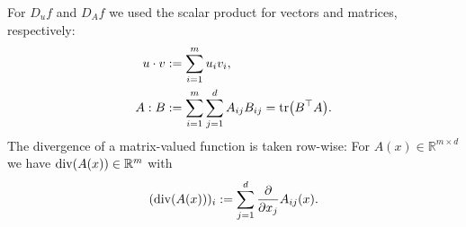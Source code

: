 For $D_uf$ and $D_Af$ we used the scalar product for vectors and matrices, respectively:
\begin{align*}
	u\cdot v&:=\sum_{i=1}^m{u_iv_i},\\
	A:B&:=\sum_{i=1}^m{\sum_{j=1}^d{A_{ij}B_{ij}}}=\operatorname{tr}\mathopen{}\left(B^\top A\right)\mathclose{}.
\end{align*}
The divergence of a matrix-valued function is taken row-wise: For $A(x)\in\mathbb{R}^{m\times d}$ we have $\operatorname{div}\mathopen{}\left(A(x)\right)\mathclose{}\in\mathbb{R}^m$ with
\[(\operatorname{div}\mathopen{}\left(A(x)\right)\mathclose{})_i:=\sum_{j=1}^d{\frac{\partial}{\partial x_j}A_{ij}(x)}.\]